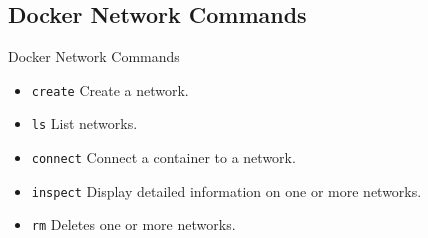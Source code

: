 \subsection{Docker Network Commands}\label{subsec:docker-network-commands}
\begin{frame}{Docker Network Commands}
    \begin{itemize}
        \item \texttt{create} Create a network.
        \item \texttt{ls} List networks.
        \item \texttt{connect} Connect a container to a network.
        \item \texttt{inspect} Display detailed information on one or more networks.
        \item \texttt{rm} Deletes one or more networks.
        
    \end{itemize}
\end{frame}